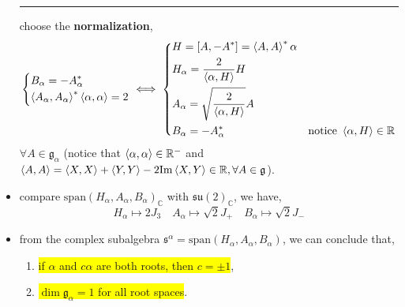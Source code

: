 \begin{itemize}
\begin{tcolorbox}[title=proof:]
		\noindent\rule[0.5ex]{\linewidth}{0.5pt} %
		
		choose the \textbf{normalization},
		\begin{equation}
			\begin{dcases}
				B_\alpha = - A_\alpha^* \\
				\braket{A_\alpha, A_\alpha}^* \braket{\alpha, \alpha} = 2
			\end{dcases} \iff \begin{dcases}
				H = [A, - A^*] = \braket{A, A}^* \alpha \\
				H_\alpha = \frac{2}{\braket{\alpha, H}} H \\
				A_\alpha = \sqrt{\frac{2}{\braket{\alpha, H}}} A \\
				B_\alpha = - A_\alpha^* & \text{notice} \ \braket{\alpha, H} \in \mathbb{R}
			\end{dcases}
		\end{equation}
		$\forall A \in \mathfrak{g}_\alpha$ (notice that $\braket{\alpha, \alpha} \in \mathbb{R}^-$ and $\braket{A, A} = \braket{X, X} + \braket{Y, Y} - 2 \mathrm{Im} \braket{X, Y} \in \mathbb{R}, \forall A \in \mathfrak{g}$).
	\end{tcolorbox}
	
	\item compare $\mathrm{span}(H_\alpha, A_\alpha, B_\alpha)_\mathbb{C}$ with $\mathfrak{su}(2)_\mathbb{C}$, we have,
	\begin{equation}
		H_\alpha \mapsto 2 J_3 \quad A_\alpha \mapsto \sqrt{2} J_+ \quad B_\alpha \mapsto \sqrt{2} J_-
	\end{equation}
	
	\item from the complex subalgebra $\mathfrak{s}^\alpha = \mathrm{span}(H_\alpha, A_\alpha, B_\alpha)$, we can conclude that,
	\begin{enumerate}
		\item \colorbox{yellow}{if $\alpha$ and $c \alpha$ are both roots, then $c = \pm 1$},
		
		\item \colorbox{yellow}{$\dim \mathfrak{g}_\alpha = 1$ for all root spaces}.
	\end{enumerate}
	

\end{itemize}
